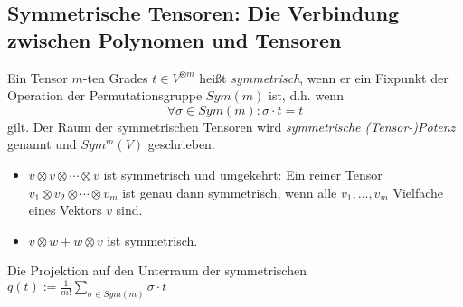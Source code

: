
\subsection{Symmetrische Tensoren: Die Verbindung zwischen Polynomen und Tensoren}

\begin{definition}\label{symmetrische_tensoren:def}
Ein Tensor $m$-ten Grades $t\in V^{\otimes m}$ heißt \emph{symmetrisch}, wenn er ein Fixpunkt der Operation der Permutationsgruppe $Sym(m)$ ist, d.h. wenn
\[\forall \sigma\in Sym(m): \sigma\cdot t = t\]
gilt. Der Raum der symmetrischen Tensoren wird \emph{symmetrische (Tensor-)Potenz} genannt und $Sym^m(V)$ geschrieben.
\end{definition}

\begin{example}
\begin{itemize}
\item $v\otimes v\otimes \cdots\otimes v$ ist symmetrisch und umgekehrt: Ein reiner Tensor $v_1\otimes v_2\otimes\cdots\otimes v_m$ ist genau dann symmetrisch, wenn alle $v_1,\ldots, v_m$ Vielfache eines Vektors $v$ sind.
\item $v\otimes w + w\otimes v$ ist symmetrisch.
\end{itemize}
\end{example}

\begin{lemma}
Die Projektion auf den Unterraum der symmetrischen 
$q(t) := \frac{1}{m!} \sum_{\sigma\in Sym(m)} \sigma\cdot t$
\end{lemma}

